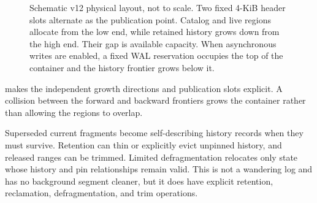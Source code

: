 \begin{figure}[t]
  \centering
  \caption{Schematic v12 physical layout, not to scale.  Two fixed 4-KiB
  header slots alternate as the publication point.  Catalog and live regions
  allocate from the low end, while retained history grows down from the
  high end.  Their gap is available capacity.  When asynchronous writes are
  enabled, a fixed WAL reservation occupies the top of the container and the
  history frontier grows below it.}
  \label{fig:container-layout}
\end{figure}

 makes the independent growth directions and
publication slots explicit.  A collision between the forward and backward
frontiers grows the container rather than allowing the regions to overlap.

Superseded current fragments become self-describing history records when they
must survive.  Retention can thin or explicitly evict unpinned history, and
released ranges can be trimmed.  Limited defragmentation relocates only state
whose history and pin relationships remain valid.  This is not a wandering
log and has no background segment cleaner, but it does have explicit retention,
reclamation, defragmentation, and trim operations.

